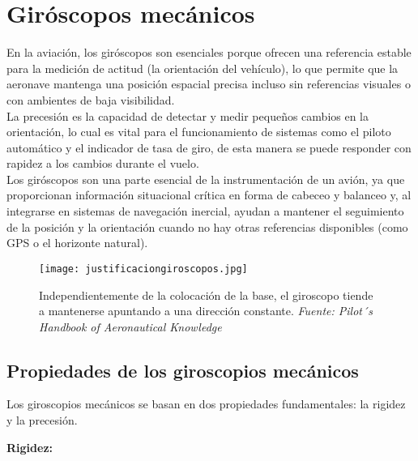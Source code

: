 \chapter{Giróscopos mecánicos}
\chapterspaceabove{6.75cm} %
\chapterspacebelow{7.25cm} %
\pagestyle{fancy}
\vspace{-1cm}

En la aviación, los giróscopos son esenciales porque ofrecen una referencia estable para la medición de actitud (la orientación del vehículo), lo que permite que la aeronave mantenga una posición espacial precisa incluso sin referencias visuales o con ambientes de baja visibilidad.\\

La precesión es la capacidad de detectar y medir pequeños cambios en la orientación, lo cual es vital para el funcionamiento de sistemas como el piloto automático y el indicador de tasa de giro, de esta manera se puede responder con rapidez a los cambios durante el vuelo.\\

Los giróscopos son una parte esencial de la instrumentación de un avión, ya que proporcionan información situacional crítica en forma de cabeceo y balanceo y, al integrarse en sistemas de navegación inercial, ayudan a mantener el seguimiento de la posición y la orientación cuando no hay otras referencias disponibles (como GPS o el horizonte natural).
\begin{figure}[H]
    \centering
    \texttt{[image: justificaciongiroscopos.jpg]}
    \caption{\centering Independientemente de la colocación de la base, el giroscopo tiende a mantenerse apuntando a una dirección constante. \textit{ Fuente: Pilot´s Handbook of Aeronautical Knowledge}}
    \label{fig:placeholdergiroscopo}
\end{figure}

\section{Propiedades de los giroscopios mecánicos}

Los giroscopios mecánicos se basan en dos propiedades fundamentales: la rigidez y la precesión.\\

\begin{nosangria}
\large{\textbf{Rigidez:}}
\end{nosangria}

